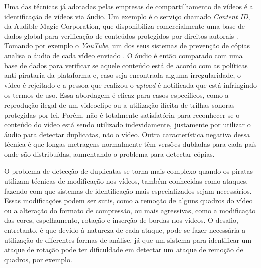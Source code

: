 Uma das técnicas já adotadas pelas empresas de compartilhamento de vídeos é a identificação de vídeos via áudio. Um exemplo é o serviço chamado \textit{Content ID}, da Audible Magic Corporation, que disponibiliza comercialmente uma base de dados global para verificação de conteúdos protegidos por direitos autorais \cite{audiblemagic}. Tomando por exemplo o \textit{YouTube}, um dos seus sistemas de prevenção de cópias analisa o áudio de cada vídeo enviado \cite{youtubeblog}. O áudio é então comparado com uma base de dados para verificar se aquele conteúdo está de acordo com as políticas anti-pirataria da plataforma e, caso seja encontrada alguma irregularidade, o vídeo é rejeitado e a pessoa que realizou o \textit{upload} é notificada que está infringindo os termos de uso. Essa abordagem é eficaz para casos específicos, como a reprodução ilegal de um videoclipe ou a utilização ilícita de trilhas sonoras protegidas por lei. Porém, não é totalmente satisfatória para reconhecer se o conteúdo do vídeo está sendo utilizado indevidamente, justamente por utilizar o áudio para detectar duplicatas, não o vídeo. Outra característica negativa dessa técnica é que longas-metragens normalmente têm versões dubladas para cada país onde são distribuídas, aumentando o problema para detectar cópias.


O problema de detecção de duplicatas se torna mais complexo quando os piratas utilizam técnicas de modificação nos vídeos, também conhecidas como ataques, fazendo com que sistemas de identificação mais especializados sejam necessários. Essas modificações podem ser sutis, como a remoção de alguns quadros do vídeo ou a alteração do formato de compressão, ou mais agressivas, como a modificação das cores, espelhamento, rotação e inserção de bordas nos vídeos. O desafio, entretanto, é que devido à natureza de cada ataque, pode se fazer necessária a utilização de diferentes formas de análise, já que um sistema para identificar um ataque de rotação pode ter dificuldade em detectar um ataque de remoção de quadros, por exemplo. 

